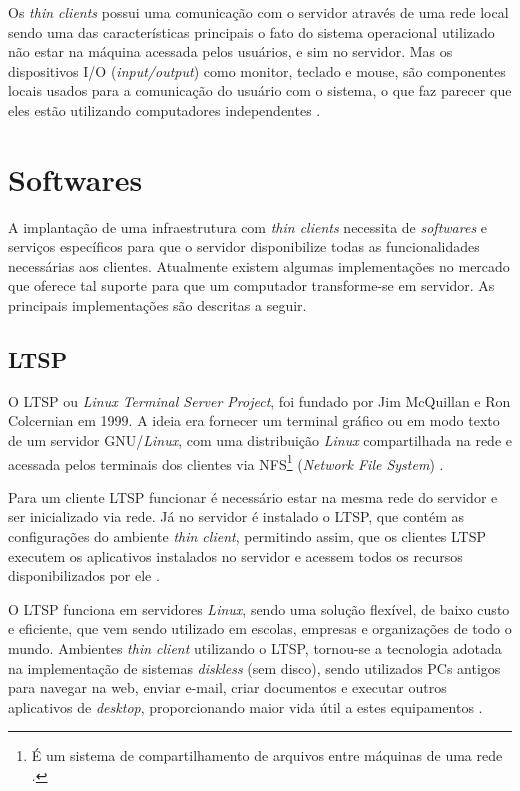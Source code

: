\documentclass[
	12pt,				%
	openright,			%
	twoside,			%
	a4paper,			%
	chapter=TITLE,		%
	english,			%
	brazil				%
	]{abntex2}
\begin{document}
Os \textit{thin clients} possui uma comunicação com o servidor através de uma rede local sendo uma das características principais o fato do sistema operacional utilizado não estar na máquina acessada pelos usuários, e sim no servidor. Mas os dispositivos I/O (\textit{input/output}) como monitor, teclado e mouse, são componentes locais usados para a comunicação do usuário com o sistema, o que faz parecer que eles estão utilizando computadores independentes \cite{richards2007linux, ComoFuncionaThinClient}.


\section{Softwares}

A implantação de uma infraestrutura com \textit{thin clients} necessita de \textit{softwares} e serviços específicos para que o servidor disponibilize todas as funcionalidades necessárias aos clientes. Atualmente existem algumas implementações no mercado que oferece tal suporte para que um computador transforme-se em servidor. As principais implementações são descritas a seguir.


\subsection{LTSP}

O LTSP ou \textit{Linux Terminal Server Project}, foi fundado por Jim McQuillan e Ron Colcernian em 1999. A ideia era fornecer um terminal gráfico ou em modo texto de um servidor GNU/\textit{Linux}, com uma distribuição \textit{Linux} compartilhada na rede e acessada pelos terminais dos clientes via NFS\footnote{É um sistema de compartilhamento de arquivos entre máquinas de uma rede \cite{nfs}.} (\textit{Network File System}) \cite{piaui}. 

Para um cliente LTSP funcionar é necessário estar na mesma rede do servidor e ser inicializado via rede.  Já no servidor é instalado o LTSP, que contém as configurações do ambiente \textit{thin client}, permitindo assim, que os clientes LTSP executem os aplicativos instalados no servidor e acessem todos os recursos disponibilizados por ele \cite{piaui}.

O LTSP funciona em servidores \textit{Linux}, sendo uma solução flexível, de baixo custo e eficiente, que vem sendo utilizado em escolas, empresas e organizações de todo o mundo. Ambientes \textit{thin client} utilizando o LTSP, tornou-se a tecnologia adotada na implementação de sistemas \textit{diskless} (sem disco), sendo utilizados PCs antigos para navegar na web, enviar e-mail, criar documentos e executar outros aplicativos de \textit{desktop}, proporcionando maior vida útil a estes equipamentos \cite{piaui,ltsp}.
\end{document}
